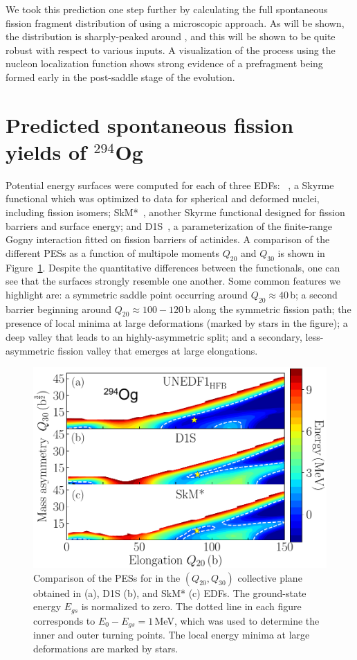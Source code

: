 We took this prediction one step further by calculating the full spontaneous fission fragment distribution of {\Og} using a microscopic approach. As will be shown, the distribution is sharply-peaked around {\Pb}, and this will be shown to be quite robust with respect to various inputs. A visualization of the process using the nucleon localization function shows strong evidence of a {\Pb} prefragment being formed early in the post-saddle stage of the evolution.

\section{Predicted spontaneous fission yields of $^{294}$Og}

Potential energy surfaces were computed for each of three EDFs: \hfb~\cite{Schunck2015}, a Skyrme functional which was optimized to data for spherical and deformed nuclei, including fission isomers; SkM*~\cite{Bartel1982}, another Skyrme functional designed for fission barriers and surface energy; and D1S~\cite{Berger1989}, a parameterization of the finite-range Gogny interaction fitted on fission barriers of actinides. A comparison of the different PESs as a function of multipole moments $Q_{20}$ and $Q_{30}$ is shown in Figure~\ref{fig:294ogthreepes}. Despite the quantitative differences between the functionals, one can see that the surfaces strongly resemble one another. Some common features we highlight are: a symmetric saddle point occurring around $Q_{20}\approx 40$\,b; a second barrier beginning around $Q_{20}\approx100-120$\,b along the symmetric fission path; the presence of local minima at large deformations (marked by stars in the figure); a deep valley that leads to an highly-asymmetric split; and a secondary, less-asymmetric fission valley that emerges at large elongations.


\begin{figure}
	\centering
	\includegraphics[width=0.7\linewidth]{TeX_files/294Og_three_PES}
	\caption[PES comparison for $^{294}$Og using EDFs {\hfb}, D1S, and SkM*.]{Comparison of the PESs for \Og{} in the $(Q_{20},Q_{30})$ collective plane obtained in \hfb{} (a), D1S (b), and SkM* (c) EDFs. The ground-state energy $E_{gs}$ is normalized to zero. The dotted line in each figure corresponds to $E_0-E_{gs}=1$\,MeV, which was used to determine the inner and outer turning points. The local energy minima at large deformations are marked by stars.}
	\label{fig:294ogthreepes}
\end{figure}

